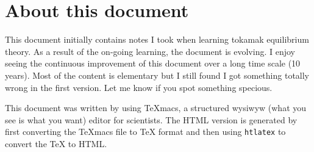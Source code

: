 \documentclass{llncs}
\begin{document}
\section{About this document}

This document initially contains notes I took when learning tokamak
equilibrium theory. As a result of the on-going learning, the document is
evolving. I enjoy seeing the continuous improvement of this document over a
long time scale (10 years). Most of the content is elementary but I still
found I got something totally wrong in the first version. Let me know if you
spot something specious.

This document was written by using TeXmacs{\cite{texmacs}}, a structured
wysiwyw (what you see is what you want) editor for scientists. The HTML
version is generated by first converting the TeXmacs file to TeX format and
then using {\texttt{htlatex}} to convert the TeX to HTML.
\end{document}
